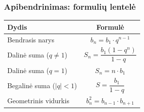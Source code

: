 \subsubsection*{Apibendrinimas: formulių lentelė}

\begin{center}
\begin{tabular}{|l|c|}
\hline
\textbf{Dydis} & \textbf{Formulė} \\
\hline
Bendrasis narys & $b_n = b_1 \cdot q^{n-1}$ \\
\hline
Dalinė suma ($q \neq 1$) & $S_n = \dfrac{b_1(1-q^n)}{1-q}$ \\[8pt]
\hline
Dalinė suma ($q = 1$) & $S_n = n \cdot b_1$ \\
\hline
Begalinė suma ($|q|<1$) & $S = \dfrac{b_1}{1-q}$ \\[8pt]
\hline
Geometrinis vidurkis & $b_n^2 = b_{n-1} \cdot b_{n+1}$ \\
\hline
\end{tabular}
\end{center}

